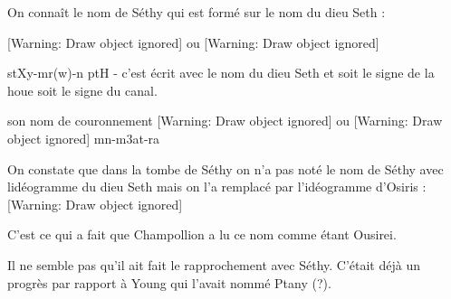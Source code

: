 \documentclass{article}
\begin{document}
On connaît le nom de Séthy qui est formé sur le nom du dieu Seth :

[Warning: Draw object ignored]  ou [Warning: Draw object ignored]  

\begin{figure}[htp]

\end{figure}
\begin{figure}[htp]

\end{figure}
stXy-mr(w)-n ptH {}- c’est écrit avec le nom du dieu Seth et soit le
signe de la houe soit le signe du canal. 

 son nom de couronnement  [Warning: Draw object ignored]  ou  [Warning:
Draw object ignored]  mn-m3at-ra

\begin{figure}[htp]

\end{figure}
\begin{figure}[htp]

\end{figure}
On constate que dans la tombe de Séthy on n’a pas noté le nom  de Séthy
avec l{\textquotesingle}idéogramme du dieu Seth mais on l’a remplacé
par l’idéogramme d’Osiris  : [Warning: Draw object ignored]

\begin{figure}[htp]

\end{figure}
C’est ce qui a fait que Champollion a lu ce nom comme étant Ousirei. 

Il ne semble pas qu’il ait fait le rapprochement avec Séthy.  C’était
déjà un progrès par rapport à Young qui l’avait nommé Ptany (?). 
\end{document}
